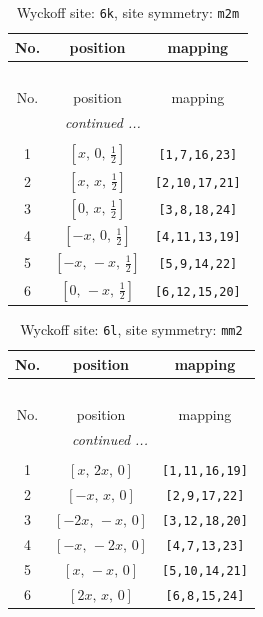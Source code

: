 \documentclass[fleqn,8pt]{jsarticle}
\begin{document}
\renewcommand{\arraystretch}{1.2}
\begin{longtable}{ccc}
\caption{Wyckoff site: {\tt 6k}, site symmetry: {\tt m2m}}
 \\
 \hline \hline
No. & position & mapping \\ \hline \endfirsthead

\multicolumn{2}{l}{\tablename\ \thetable{}} \\
 \hline \hline
No. & position & mapping \\ \hline \endhead

 \hline \hline
\multicolumn{2}{r}{\footnotesize\it continued ...} \\ \endfoot

 \hline \hline
\multicolumn{2}{r}{} \\ \endlastfoot

1 & $\left[ x,\, 0,\, \frac{1}{2} \right]$ & {\tt [1,7,16,23]} \\ \hline
2 & $\left[ x,\, x,\, \frac{1}{2} \right]$ & {\tt [2,10,17,21]} \\ \hline
3 & $\left[ 0,\, x,\, \frac{1}{2} \right]$ & {\tt [3,8,18,24]} \\ \hline
4 & $\left[ - x,\, 0,\, \frac{1}{2} \right]$ & {\tt [4,11,13,19]} \\ \hline
5 & $\left[ - x,\, - x,\, \frac{1}{2} \right]$ & {\tt [5,9,14,22]} \\ \hline
6 & $\left[ 0,\, - x,\, \frac{1}{2} \right]$ & {\tt [6,12,15,20]} \\
\end{longtable}
\renewcommand{\arraystretch}{1.2}
\begin{longtable}{ccc}
\caption{Wyckoff site: {\tt 6l}, site symmetry: {\tt mm2}}
 \\
 \hline \hline
No. & position & mapping \\ \hline \endfirsthead

\multicolumn{2}{l}{\tablename\ \thetable{}} \\
 \hline \hline
No. & position & mapping \\ \hline \endhead

 \hline \hline
\multicolumn{2}{r}{\footnotesize\it continued ...} \\ \endfoot

 \hline \hline
\multicolumn{2}{r}{} \\ \endlastfoot

1 & $\left[ x,\, 2 x,\, 0 \right]$ & {\tt [1,11,16,19]} \\ \hline
2 & $\left[ - x,\, x,\, 0 \right]$ & {\tt [2,9,17,22]} \\ \hline
3 & $\left[ - 2 x,\, - x,\, 0 \right]$ & {\tt [3,12,18,20]} \\ \hline
4 & $\left[ - x,\, - 2 x,\, 0 \right]$ & {\tt [4,7,13,23]} \\ \hline
5 & $\left[ x,\, - x,\, 0 \right]$ & {\tt [5,10,14,21]} \\ \hline
6 & $\left[ 2 x,\, x,\, 0 \right]$ & {\tt [6,8,15,24]} \\
\end{longtable}
\end{document}
